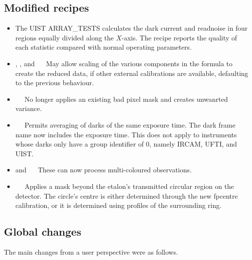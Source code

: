 \documentclass[twoside,11pt,nolof]{starlink}
\begin{document}
\subsection{Modified recipes}
\begin{itemize}
  \item The UIST ARRAY\_TESTS calculates the dark current and readnoise
    in four regions equally divided along the $X$-axis.  The recipe
    reports the quality of each statistic compared with normal
    operating parameters.
  \item {}, , and
    ~~
    May allow scaling of the various components in the formula to create
    the reduced data, if other external calibrations are available,
    defaulting to the previous behaviour.
  \item {}~~
    No longer applies an existing bad pixel mask and creates unwanrted
    variance.
  \item {}~~
    Permits averaging of darks of the same exposure time.  The dark
    frame name now includes the exposure time.  This does not apply
    to instruments whose darks only have a group identifier of 0,
    namely IRCAM, UFTI, and UIST.
  \item {} and ~~
    These can now process multi-coloured observations.
  \item {}~~
    Applies a mask beyond the etalon's transmitted circular region
    on the detector.  The circle's centre is either determined through
    the new fpcentre calibration, or it is determined using profiles of
    the surrounding ring.
\end{itemize}

\subsection{Global changes}

The main changes from a user perspective were as follows.
\end{document}
